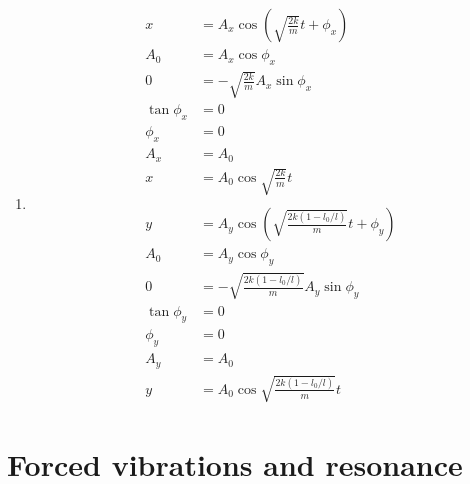 \documentclass{article}
\begin{document}
\begin{enumerate}
  \item

        \begin{align*}
          x           & = A_x \cos \left( \sqrt{\frac{2 k}{m}} t + \phi_x \right)               \\
          A_0         & = A_x \cos \phi_x                                                       \\
          0           & = -\sqrt{\frac{2 k}{m}} A_x \sin \phi_x                                 \\
          \tan \phi_x & = 0                                                                     \\
          \phi_x      & = 0                                                                     \\
          A_x         & = A_0                                                                   \\
          x           & = A_0 \cos \sqrt{\frac{2 k}{m}} t                                       \\ \\
          y           & = A_y \cos \left( \sqrt{\frac{2 k (1 - l_0 / l)}{m}} t + \phi_y \right) \\
          A_0         & = A_y \cos \phi_y                                                       \\
          0           & = -\sqrt{\frac{2 k (1 - l_0 / l)}{m}} A_y \sin \phi_y                   \\
          \tan \phi_y & = 0                                                                     \\
          \phi_y      & = 0                                                                     \\
          A_y         & = A_0                                                                   \\
          y           & = A_0 \cos \sqrt{\frac{2 k (1 - l_0 / l)}{m}} t
        \end{align*}
\end{enumerate}

\section{Forced vibrations and resonance}

\setcounter{subsection}{2}
\subsection{}
\end{document}
